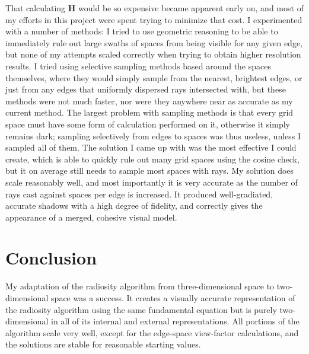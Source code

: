 \documentclass[letter]{article}
\newcommand{\vect}[1]{\boldsymbol{#1}}
\begin{document}
That calculating $\vect{H}$ would be so expensive became apparent early on, and most of my efforts in this project were spent trying to minimize that cost. I experimented with a number of methods: I tried to use geometric reasoning to be able to immediately rule out large swaths of spaces from being visible for any given edge, but none of my attempts scaled correctly when trying to obtain higher resolution results. I tried using selective sampling methods based around the spaces themselves, where they would simply sample from the nearest, brightest edges, or just from any edges that uniformly dispersed rays intersected with, but these methods were not much faster, nor were they anywhere near as accurate as my current method. The largest problem with sampling methods is that every grid space must have some form of calculation performed on it, otherwise it simply remains dark; sampling selectively from edges to spaces was thus useless, unless I sampled all of them. The solution I came up with was the most effective I could create, which is able to quickly rule out many grid spaces using the cosine check, but it on average still needs to sample most spaces with rays. My solution does scale reasonably well, and most importantly it is very accurate as the number of rays cast against spaces per edge is increased. It produced well-gradiated, accurate shadows with a high degree of fidelity, and correctly gives the appearance of a merged, cohesive visual model.

\section{Conclusion}
My adaptation of the radiosity algorithm from three-dimensional space to two-dimensional space was a success. It creates a visually accurate representation of the radiosity algorithm using the same fundamental equation but is purely two-dimensional in all of its internal and external representations. All portions of the algorithm scale very well, except for the edge-space view-factor calculations, and the solutions are stable for reasonable starting values.
\end{document}
